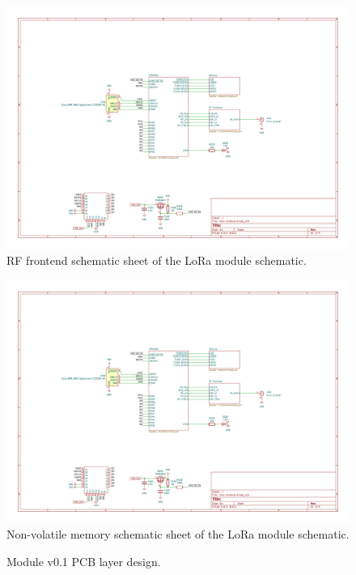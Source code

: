 \begin{figure}
    \includegraphics[page=3,angle=-90,width=\textwidth]{boards/v0.1/lora-module.pdf}
    \caption{\label{schematic:v0.1-3}RF frontend schematic sheet of the LoRa module schematic.}
\end{figure}
\begin{figure}
    \includegraphics[page=4,angle=-90,width=\textwidth]{boards/v0.1/lora-module.pdf}
    \caption{\label{schematic:v0.1-4}Non-volatile memory schematic sheet of the LoRa module schematic.}
\end{figure}

\begin{figure}
    \hfill
    \hfill
    \hfill
    \caption{\label{board:v0.1}Module v0.1 PCB layer design.}
\end{figure}

